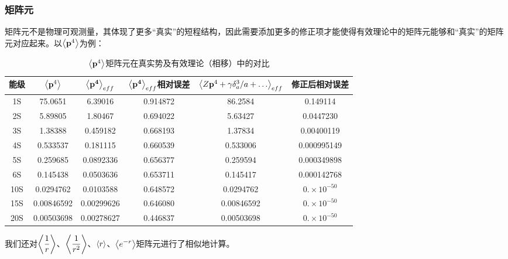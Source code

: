 \documentclass[8pt]{beamer}
\begin{document}
\begin{frame}
\frametitle{矩阵元}
矩阵元不是物理可观测量，其体现了更多“真实”的短程结构，因此需要添加更多的修正项才能使得有效理论中的矩阵元能够和“真实”的矩阵元对应起来。以$\expval{\vb{p}^4}$为例：
\begin{table}[!hbtp]
\footnotesize
  \centering
  \begin{tabular}{|cccccc|}
    \hline
    能级 & $\expval{\vb{p}^4}$ & $\expval{\vb{p^4}}_{eff}$ & $\expval{\vb{p^4}}_{eff}$相对误差 & $\expval{Z\vb{p}^4+\gamma \delta^3_a/a+\dots}_{eff}$ & 修正后相对误差 \\
    \hline
    1S & 75.0651 & 6.39016&0.914872 & 86.2584&0.149114 \\
    2S & 5.89805 & 1.80467&0.694022 & 5.63427&0.0447230 \\
    3S & 1.38388 & 0.459182&0.668193 & 1.37834&0.00400119 \\
    4S & 0.533537 & 0.181115&0.660539 & 0.533006&0.000995149 \\
    5S & 0.259685 & 0.0892336&0.656377 & 0.259594&0.000349898 \\
    6S & 0.145438 & 0.0503636&0.653711 & 0.145417&0.000142768 \\
    10S& 0.0294762 & 0.0103588 & 0.648572 & 0.0294762 & $0.\times10^{-50}$\\
    15S& 0.00846592 & 0.00299626 & 0.646080 & 0.00846592 &  $0.\times10^{-50}$\\
    20S& 0.00503698 & 0.00278627 & 0.446837 & 0.00503698 & $0.\times10^{-50}$\\
    \hline
  \end{tabular}
  \caption{$\expval{\vb{p}^4}$矩阵元在真实势及有效理论（相移）中的对比}\label{p41}
\end{table}
我们还对$\displaystyle\expval{\frac{1}{r}}$、$\displaystyle\expval{\frac{1}{r^2}}$、$\displaystyle\expval{r}$、$\displaystyle\expval{e^{-r}}$矩阵元进行了相似地计算。
\end{frame}
\end{document}
